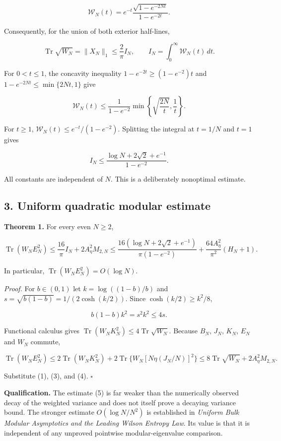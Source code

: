 \documentclass[
  10pt,
  a4paper,
]{article}
\begin{document}
\[
\mathcal W_N(t)=e^{-t}\frac{\sqrt{1-e^{-2Nt}}}{1-e^{-2t}}.
\]

Consequently, for the union of both exterior half-lines,

\[
\operatorname{Tr}\sqrt{W_N}=\|X_N\|_1\le\frac2\pi I_N,
\qquad I_N=\int_0^\infty\mathcal W_N(t)\,dt.
\tag{3}
\]

For \(0<t\le1\), the concavity inequality \(1-e^{-2t}\ge(1-e^{-2})t\) and \(1-e^{-2Nt}\le\min\{2Nt,1\}\) give

\[
\mathcal W_N(t)\le\frac{1}{1-e^{-2}}\min\left\{\sqrt{\frac{2N}{t}},\frac1t\right\}.
\]

For \(t\ge1\), \(\mathcal W_N(t)\le e^{-t}/(1-e^{-2})\). Splitting the integral at \(t=1/N\) and \(t=1\) gives

\[
\boxed{I_N\le\frac{\log N+2\sqrt2+e^{-1}}{1-e^{-2}}.}\tag{4}
\]

All constants are independent of \(N\). This is a deliberately nonoptimal estimate.

\subsection{3. Uniform quadratic modular estimate}\label{uniform-quadratic-modular-estimate}

\textbf{Theorem 1.} For every even \(N\ge2\),

\[
\boxed{
\operatorname{Tr}(W_NE_N^2)
\le \frac{16}{\pi} I_N+2A_\eta^2 M_{2,N}
\le\frac{16(\log N+2\sqrt2+e^{-1})}{\pi(1-e^{-2})}
+\frac{64A_\eta^2}{\pi^2}(H_N+1).}
\tag{5}
\]

In particular, \(\operatorname{Tr}(W_NE_N^2)=O(\log N)\).

\emph{Proof.} For \(b\in(0,1)\) let \(k=\log((1-b)/b)\) and \(s=\sqrt{b(1-b)}=1/(2\cosh(k/2))\). Since \(\cosh(k/2)\ge k^2/8\),

\[
b(1-b)k^2=s^2k^2\le 4s.
\tag{6}
\]

Functional calculus gives \(\operatorname{Tr}(W_NK_N^2)\le4\operatorname{Tr}\sqrt{W_N}\). Because \(B_N\), \(J_N\), \(K_N\), \(E_N\) and \(W_N\) commute,

\[
\operatorname{Tr}(W_NE_N^2)
\le2\operatorname{Tr}(W_NK_N^2)
+2\operatorname{Tr}\{W_N[N\eta(J_N/N)]^2\}
\le8\operatorname{Tr}\sqrt{W_N}+2A_\eta^2M_{2,N}.
\]

Substitute (1), (3), and (4). \(\square\)

\textbf{Qualification.} The estimate (5) is far weaker than the numerically observed decay of the weighted variance and does not itself prove a decaying variance bound. The stronger estimate \(O(\log N/N^2)\) is established in \emph{Uniform Bulk Modular Asymptotics and the Leading Wilson Entropy Law}. Its value is that it is independent of any unproved pointwise modular-eigenvalue comparison.
\end{document}
